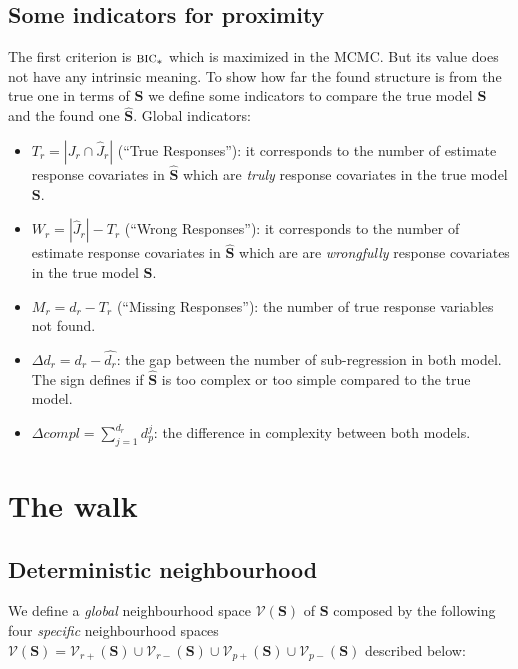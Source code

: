 \documentclass[12pt,a4paper]{report}
\begin{document}
		\subsection{Some indicators for proximity} \label{sectioncompZ}
		The first criterion is $\mbox{{\sc bic}}_*$ which is maximized in the MCMC. But its value does not have any intrinsic meaning. To show how far the found structure is from the true one in terms of $\boldsymbol{S}$ we define some indicators to compare the true model $\boldsymbol{S}$ and the found one $\hat{\boldsymbol{S}}$.
			Global indicators:
			\begin{itemize}
				\item $T_r=|J_r \cap \hat{J}_r|$ (``True Responses''): it corresponds to the number of estimate response covariates in $\hat{\boldsymbol{S}}$ which are {\it truly} response covariates in the true model $\boldsymbol{S}$.
				\item $W_r=|\hat{J}_r|-T_r$ (``Wrong Responses''): it corresponds to the number of estimate response covariates in $\hat{\boldsymbol{S}}$ which are are {\it wrongfully} response covariates in the true model $\boldsymbol{S}$.
				\item $M_r=d_r-T_r$ (``Missing Responses''): the number of true response variables not found.
				\item $\Delta d_r=d_r-\hat{d_r}$: the gap between the number of sub-regression in both model. The sign defines if $\hat{\boldsymbol{S}}$ is too complex or too simple compared to the true model.
				\item $\Delta compl=\sum_{j=1}^{d_r}d_p^j$: the difference in complexity between both models.
			\end{itemize}

			
			
	\section{The walk}
		\subsection{Deterministic neighbourhood}
	
We define a {\it global} neighbourhood space $\mathcal{V}(\boldsymbol{S})$ of $\boldsymbol{S}$ composed by the following four {\it specific} neighbourhood spaces $\mathcal{V}(\boldsymbol{S})=\mathcal{V}_{r+}(\boldsymbol{S})\cup\mathcal{V}_{r-}(\boldsymbol{S})\cup\mathcal{V}_{p+}(\boldsymbol{S})\cup\mathcal{V}_{p-}(\boldsymbol{S})$ described below:
\end{document}
